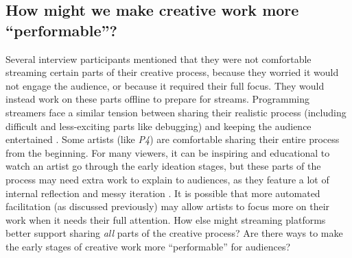 

\subsection{How might we make creative work more ``performable''?}
Several interview participants mentioned that they were not comfortable streaming certain parts of their creative process, because they worried it would not engage the audience, or because it required their full focus. They would instead work on these parts offline to prepare for streams. Programming streamers face a similar tension between sharing their realistic process (including difficult and less-exciting parts like debugging) and keeping the audience entertained \cite{Faas2018}. Some artists (like \textit{P4}) are comfortable sharing their entire process from the beginning. For many viewers, it can be inspiring and educational to watch an artist go through the early ideation stages, but these parts of the process may need extra work to explain to audiences,
as they feature a lot of internal reflection and messy iteration \cite{Schon1983}. It is possible that more automated facilitation (as discussed previously) may allow artists to focus more on their work when it needs their full attention. How else might streaming platforms better support sharing \textit{all} parts of the creative process? Are there ways to make the early stages of creative work more ``performable'' for audiences? 

